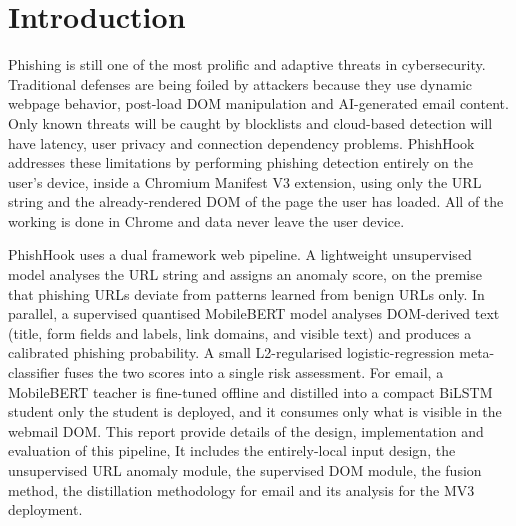 \documentclass{FastFyp}
\begin{document}
\pagestyle{fancy}
\tableofcontents

\pagebreak
\listoffigures
{}
\pagebreak
\listoftables
{}

\mainmatter

\chapter{Introduction}
\label{ch:intro}
Phishing is still one of the most prolific and adaptive threats in cybersecurity. Traditional defenses are being foiled by attackers because they use dynamic webpage behavior, post-load DOM manipulation and AI-generated email content. Only known threats will be caught by blocklists and cloud-based detection will have latency, user privacy and connection dependency problems. PhishHook addresses these limitations by performing phishing detection entirely on the user's device, inside a Chromium Manifest V3 extension, using only the URL string and the already-rendered DOM of the page the user has loaded. All of the working is done in Chrome and data never leave the user device. 

PhishHook uses a dual framework web pipeline. A lightweight unsupervised model analyses the URL string and assigns an anomaly score, on the premise that phishing URLs deviate from patterns learned from benign URLs only. In parallel, a supervised quantised MobileBERT model analyses DOM-derived text (title, form fields and labels, link domains, and visible text) and produces a calibrated phishing probability. A small L2-regularised logistic-regression meta-classifier fuses the two scores into a single risk assessment. For email, a MobileBERT teacher is fine-tuned offline and distilled into a compact BiLSTM student only the student is deployed, and it consumes only what is visible in the webmail DOM. This report provide details of the design, implementation and evaluation of this pipeline,
It includes the entirely-local input design, the unsupervised URL anomaly module, the supervised DOM module, the fusion method, the distillation methodology for email and its analysis for the MV3 deployment.
\end{document}
